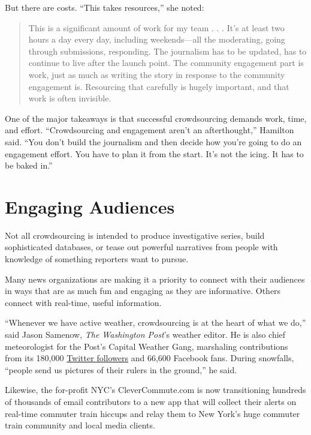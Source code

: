 \documentclass[notoc, symmetric, nobib, nols]{towcenter-guideto-book}
\begin{document}
But there are costs. ``This takes resources,'' she noted: 
\begin{quote}
This is a significant amount of work for my team . . . It's at least two hours a day every day, including weekends---all the moderating, going through submissions, responding. The journalism has to be updated, has to continue to live after the launch point. The community engagement part is work, just as much as writing the story in response to the community engagement is. Resourcing that carefully is hugely important, and that work is often invisible. \end{quote}

One of the major takeaways is that successful crowdsourcing demands work, time, and effort. ``Crowdsourcing and engagement aren't an afterthought,'' Hamilton said. ``You don't build the journalism and then decide how you're going to do an engagement effort. You have to plan it from the start. It's not the icing. It has to be baked in.'' 

\section{Engaging Audiences} 

Not all crowdsourcing is intended to produce investigative series, build sophisticated databases, or tease out powerful narratives from people with knowledge of something reporters want to pursue.

Many news organizations are making it a priority to connect with their audiences in ways that are as much fun and engaging as they are informative. Others connect with real-time, useful information.  

``Whenever we have active weather, crowdsourcing is at the heart of what we do,'' said Jason Samenow, \textit{The Washington Post}'s weather editor. He is also chief meteorologist for the Post's Capital Weather Gang, marshaling contributions from its 180,000 \href{https://twitter.com/capitalweather?ref_src=twsrc%5Egoogle%7Ctwcamp%5Eserp%7Ctwgr%5Eauthor}{Twitter followers} and 66,600 Facebook fans. During snowfalls, ``people send us pictures of their rulers in the ground,'' he said.%

Likewise, the for-profit NYC's CleverCommute.com is now transitioning hundreds of thousands of email contributors to a new app that will collect their alerts on real-time commuter train hiccups and relay them to New York's huge commuter train community and local media clients.%
\end{document}
